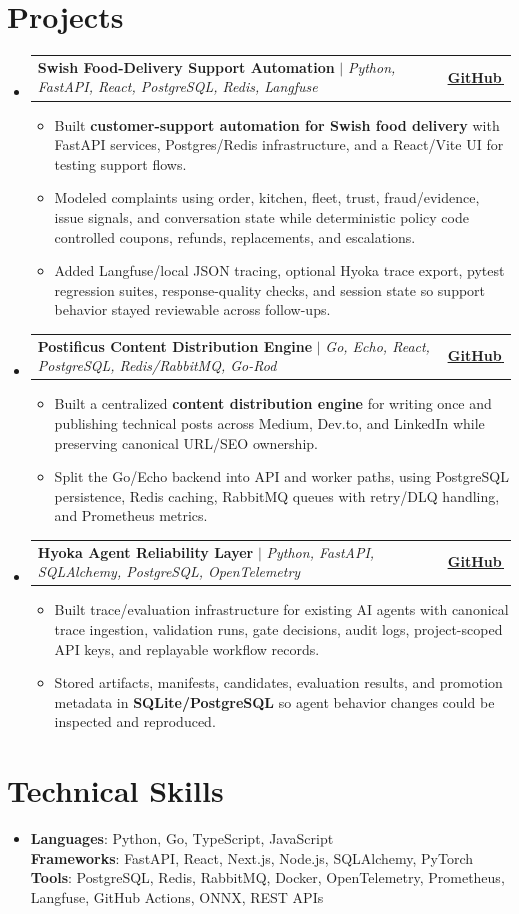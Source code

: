 \documentclass[letterpaper,11pt]{article}
\makeatletter
\newcommand{\bodyhref}[2]{\href{#1}{\underline{#2}\,\faExternalLink*}}
\newcommand{\resumeItem}[1]{\item{\fontsize{8.82pt}{9.28pt}\selectfont #1\vspace{-0.7pt}}}
\newcommand{\resumeProjectHeading}[2]{
    \item
    \begin{tabular*}{1.0\textwidth}{l@{\extracolsep{\fill}}r}
      \small#1 & \textbf{\small #2}\\
    \end{tabular*}\vspace{-4pt}
}
\newcommand{\resumeSubHeadingListStart}{\begin{itemize}[leftmargin=0.0in, label={}, itemsep=0.6pt, topsep=0pt, parsep=0pt, partopsep=0pt]}
\newcommand{\resumeSubHeadingListEnd}{\end{itemize}}
\newcommand{\resumeItemListStart}{\begin{itemize}[leftmargin=0.16in,itemsep=0.3pt,topsep=0.9pt,parsep=0pt,partopsep=0pt]}
\newcommand{\resumeItemListEnd}{\end{itemize}\vspace{-3pt}}
\makeatother
\begin{document}
\section{Projects}
\resumeSubHeadingListStart
\resumeProjectHeading
{\textbf{Swish Food-Delivery Support Automation} $|$ \emph{Python, FastAPI, React, PostgreSQL, Redis, Langfuse}}{\bodyhref{https://github.com/unichronic/swishagent}{GitHub}}
\resumeItemListStart
\resumeItem{Built \textbf{customer-support automation for Swish food delivery} with FastAPI services, Postgres/Redis infrastructure, and a React/Vite UI for testing support flows.}
\resumeItem{Modeled complaints using order, kitchen, fleet, trust, fraud/evidence, issue signals, and conversation state while deterministic policy code controlled coupons, refunds, replacements, and escalations.}
\resumeItem{Added Langfuse/local JSON tracing, optional Hyoka trace export, pytest regression suites, response-quality checks, and session state so support behavior stayed reviewable across follow-ups.}
\resumeItemListEnd
\resumeProjectHeading
{\textbf{Postificus Content Distribution Engine} $|$ \emph{Go, Echo, React, PostgreSQL, Redis/RabbitMQ, Go-Rod}}{\bodyhref{https://github.com/unichronic/postificus}{GitHub}}
\resumeItemListStart
\resumeItem{Built a centralized \textbf{content distribution engine} for writing once and publishing technical posts across Medium, Dev.to, and LinkedIn while preserving canonical URL/SEO ownership.}
\resumeItem{Split the Go/Echo backend into API and worker paths, using PostgreSQL persistence, Redis caching, RabbitMQ queues with retry/DLQ handling, and Prometheus metrics.}
\resumeItemListEnd
\resumeProjectHeading
{\textbf{Hyoka Agent Reliability Layer} $|$ \emph{Python, FastAPI, SQLAlchemy, PostgreSQL, OpenTelemetry}}{\bodyhref{https://github.com/unichronic/hyoka}{GitHub}}
\resumeItemListStart
\resumeItem{Built trace/evaluation infrastructure for existing AI agents with canonical trace ingestion, validation runs, gate decisions, audit logs, project-scoped API keys, and replayable workflow records.}
\resumeItem{Stored artifacts, manifests, candidates, evaluation results, and promotion metadata in \textbf{SQLite/PostgreSQL} so agent behavior changes could be inspected and reproduced.}
\resumeItemListEnd
\resumeSubHeadingListEnd

\section{Technical Skills}
\begin{itemize}[leftmargin=0.15in, label={}, topsep=0pt, itemsep=0pt, parsep=0pt, partopsep=0pt]
  \item{\fontsize{9.0pt}{9.25pt}\selectfont
   \textbf{Languages}{: Python, Go, TypeScript, JavaScript} \\
   \textbf{Frameworks}{: FastAPI, React, Next.js, Node.js, SQLAlchemy, PyTorch} \\
   \textbf{Tools}{: PostgreSQL, Redis, RabbitMQ, Docker, OpenTelemetry, Prometheus, Langfuse, GitHub Actions, ONNX, REST APIs} \\
  }
\end{itemize}
\end{document}
